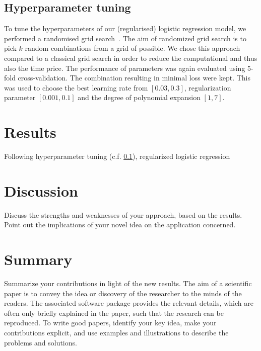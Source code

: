 \documentclass[10pt,conference,compsocconf]{IEEEtran}
\begin{document}
    \subsection{Hyperparameter tuning}\label{subsubsec: parameter_tuning}
    To tune the hyperparameters of our (regularised) logistic regression model, we performed a randomised grid search~\cite{jonasbenner2019}. The aim of randomized grid search is to pick $k$ random combinations from a grid of possible. We chose this approach compared to a classical grid search in order to reduce the computational and thus also the time price. The performance of parameters was again evaluated using 5-fold cross-validation. The combination resulting in minimal loss were kept. This was used to choose the best learning rate from  $[0.03,0.3]$, regularization parameter $[0.001,0.1]$ and the degree of polynomial expansion $[1,7]$.
    
\section{Results}\label{sec: results}
Following hyperparameter tuning (c.f. \ref{subsubsec: parameter_tuning}), regularized logistic regression 
\section{Discussion}\label{sec: discussion}
Discuss the strengths and weaknesses of your
  approach, based on the results. Point out the implications of your
  novel idea on the application concerned.
\section{Summary}\label{sec: summary}
Summarize your contributions in light of the new
  results.
The aim of a scientific paper is to convey the idea or discovery of
the researcher to the minds of the readers. The associated software
package provides the relevant details, which are often only briefly
explained in the paper, such that the research can be reproduced.
To write good papers, identify your key idea, make your contributions
explicit, and use examples and illustrations to describe the problems
and solutions.
\end{document}
